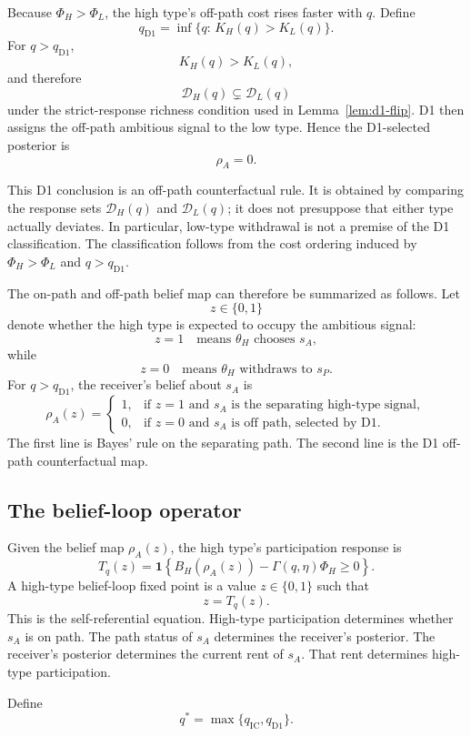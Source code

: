 Because \(\Phi_H>\Phi_L\), the high type's off-path cost rises faster with \(q\). Define
\[
q_{\mathrm{D1}}
=
\inf\{q:\,K_H(q)>K_L(q)\}.
\]
For \(q>q_{\mathrm{D1}}\),
\[
K_H(q)>K_L(q),
\]
and therefore
\[
\mathcal D_H(q)\subsetneq \mathcal D_L(q)
\]
under the strict-response richness condition used in Lemma~\ref{lem:d1-flip}. D1 then assigns the off-path ambitious signal to the low type. Hence the D1-selected posterior is
\[
\rho_A=0.
\]

This D1 conclusion is an off-path counterfactual rule. It is obtained by comparing the response sets \(\mathcal D_H(q)\) and \(\mathcal D_L(q)\); it does not presuppose that either type actually deviates. In particular, low-type withdrawal is not a premise of the D1 classification. The classification follows from the cost ordering induced by \(\Phi_H>\Phi_L\) and \(q>q_{\mathrm{D1}}\).

The on-path and off-path belief map can therefore be summarized as follows. Let
\[
z\in\{0,1\}
\]
denote whether the high type is expected to occupy the ambitious signal:
\[
z=1 \quad\text{means } \theta_H \text{ chooses }s_A,
\]
while
\[
z=0 \quad\text{means } \theta_H \text{ withdraws to }s_P.
\]
For \(q>q_{\mathrm{D1}}\), the receiver's belief about \(s_A\) is
\[
\rho_A(z)=
\begin{cases}
1, & \text{if }z=1\text{ and }s_A\text{ is the separating high-type signal},\\
0, & \text{if }z=0\text{ and }s_A\text{ is off path, selected by D1}.
\end{cases}
\]
The first line is Bayes' rule on the separating path. The second line is the D1 off-path counterfactual map.

\subsection{The belief-loop operator}
\label{subsec:belief-loop-operator}

Given the belief map \(\rho_A(z)\), the high type's participation response is
\[
T_q(z)
=
\mathbf{1}\left\{
B_H(\rho_A(z))-\Gamma(q,\eta)\Phi_H\ge 0
\right\}.
\]
A high-type belief-loop fixed point is a value \(z\in\{0,1\}\) such that
\[
z=T_q(z).
\]
This is the self-referential equation. High-type participation determines whether \(s_A\) is on path. The path status of \(s_A\) determines the receiver's posterior. The receiver's posterior determines the current rent of \(s_A\). That rent determines high-type participation.

Define
\[
q^*=\max\{q_{\mathrm{IC}},q_{\mathrm{D1}}\}.
\]

